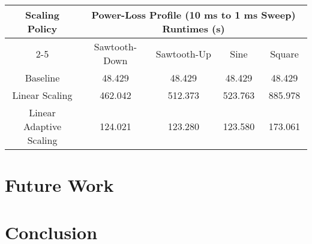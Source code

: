 \documentclass[journal, twoside]{IEEEtran}
\begin{document}
\begin{table*}
    \renewcommand{\arraystretch}{1.3} %
    \caption{5 MB Workload Execution Times (1 millisecond dead-time)}
    \label{power-loss-profile-performance}
    \centering
    \begin{tabular}{c||c|c|c|c}
        \hline
        \multirow{2}{*}{Scaling Policy} & \multicolumn{4}{c}{Power-Loss Profile (10 ms to 1 ms Sweep) Runtimes (s)} \\\cline{2-5}
        {} & {Sawtooth-Down} & {Sawtooth-Up} & {Sine} & {Square}\\
        \hline
        \hline
        {Baseline}                  &  {48.429} &  {48.429} &  {48.429} &  {48.429}\\
        {Linear Scaling}            & {462.042} & {512.373} & {523.763} & {885.978}\\
        {Linear Adaptive Scaling}   & {124.021} & {123.280} & {123.580} & {173.061}\\
        \hline
    \end{tabular}
\end{table*}

\section{Future Work}

\lipsum[4]

\section{Conclusion}

\lipsum[2]



\end{document}
